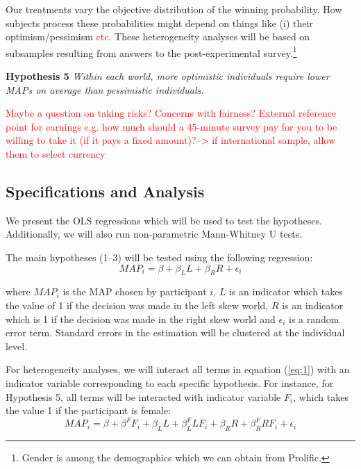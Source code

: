 Our treatments vary the objective distribution of the winning probability.
How subjects process these probabilities might depend on things like (i) their optimism/pessimism \textcolor{red}{etc}.
These heterogeneity analyses will be based on subsamples resulting from answers to the post-experimental survey.\footnote{
Gender is among the demographics which we can obtain from Prolific.
}

\noindent \textbf{Hypothesis 5} \quad \textit{Within each world, more optimistic individuals require lower MAPs on average than pessimistic individuals.}

\textcolor{red}{Maybe a question on taking risks? Concerns with fairness? External reference point for earnings e.g. how much should a 45-minute survey pay for you to be willing to take it (if it pays a fixed amount)?--> if international sample, allow them to select currency}



\subsection{Specifications and Analysis}
We present the OLS regressions which will be used to test the hypotheses.
Additionally, we will also run non-parametric Mann-Whitney U tests.

The main hypotheses (1--3) will be tested using the following regression:
\begin{equation} \label{eq:1}
MAP_i = \beta + \beta_L L + \beta_R R + \epsilon_i
\end{equation}

\noindent where $MAP_i$ is the MAP chosen by participant $i$, $L$ is an indicator which takes the value of 1 if the decision was made in the left skew world, $R$ is an indicator which is 1 if the decision was made in the right skew world and $\epsilon_i$ is a random error term.
Standard errors in the estimation will be clustered at the individual level.

For heterogeneity analyses, we will interact all terms in equation (\ref{eq:1}) with an indicator variable corresponding to each specific hypothesis.
For instance, for Hypothesis 5, all terms will be interacted with indicator variable $F_i$, which takes the value 1 if the participant is female:
\begin{equation} \label{eq:2}
MAP_i = \beta + \beta^F F_i + \beta_L L + \beta_L^F L F_i + \beta_R R + \beta_R^F R F_i + \epsilon_i
\end{equation}

